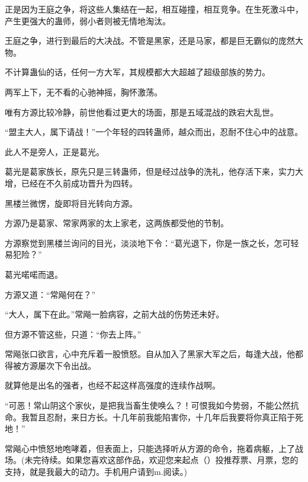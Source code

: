 \begin{this_body}
正是因为王庭之争，将这些人集结在一起，相互碰撞，相互竞争。在生死激斗中，产生更强大的蛊师，弱小者则被无情地淘汰。

王庭之争，进行到最后的大决战。不管是黑家，还是马家，都是巨无霸似的庞然大物。

不计算蛊仙的话，任何一方大军，其规模都大大超越了超级部族的势力。

两军上下，无不看的心驰神摇，胸怀激荡。

唯有方源比较冷静，前世他看过更大的场面，那是五域混战的跌宕大乱世。

“盟主大人，属下请战！”一个年轻的四转蛊师，越众而出，忍耐不住心中的战意。

此人不是旁人，正是葛光。

葛光是葛家族长，原先只是三转蛊师，但是经过战争的洗礼，他存活下来，实力大增，已经在不久前成功晋升为四转。

黑楼兰微愣，旋即将目光转向方源。

方源乃是葛家、常家两家的太上家老，这两族都受他的节制。

方源察觉到黑楼兰询问的目光，淡淡地下令：“葛光退下，你是一族之长，怎可轻易犯险？”

葛光喏喏而退。

方源又道：“常飚何在？”

“大人，属下在此。”常飚一脸病容，之前大战的伤势还未好。

但方源不管这些，只道：“你去上阵。”

常飚张口欲言，心中充斥着一股愤怒。自从加入了黑家大军之后，每逢大战，他都得被方源屡次下令出战。

就算他是出名的强者，也经不起这样高强度的连续作战啊。

“可恶！常山阴这个家伙，是把我当畜生使唤么？！可恨我如今势弱，不能公然抗命。我暂且忍耐，来日方长。十几年前我能陷害你，十几年后我要将你真正陷于死地！”

常飚心中愤怒地咆哮着，但表面上，只能选择听从方源的命令，拖着病躯，上了战场。(未完待续。如果您喜欢这部作品，欢迎您来起点（）投推荐票、月票，您的支持，就是我最大的动力。手机用户请到m.阅读。)

\end{this_body}

